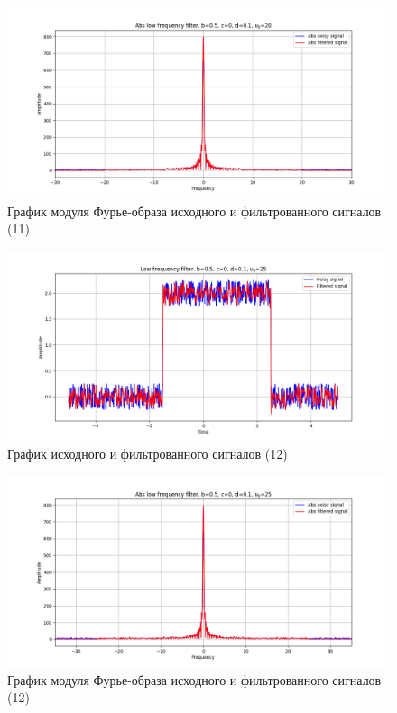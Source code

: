 \documentclass[a4paper, 12pt]{article}
\begin{document}
    \begin{figure}[!htb]
        \centering
        \includegraphics[scale=0.48]{6_abs_u_U_nohigh.png}
        \captionsetup{skip=0pt}
        \caption{График модуля Фурье-образа исходного и фильтрованного сигналов (11)}
        \label{fig:fig22}
    \end{figure}
    \begin{figure}[!htb]
        \centering
        \includegraphics[scale=0.48]{10_u_flt_u_nohigh.png}
        \captionsetup{skip=0pt}
        \caption{График исходного и фильтрованного сигналов (12)}
        \label{fig:fig23}
    \end{figure}
    \begin{figure}[!htb]
        \centering
        \includegraphics[scale=0.48]{10_abs_u_U_nohigh.png}
        \captionsetup{skip=0pt}
        \caption{График модуля Фурье-образа исходного и фильтрованного сигналов (12)}
        \label{fig:fig24}
    \end{figure}
\end{document}
